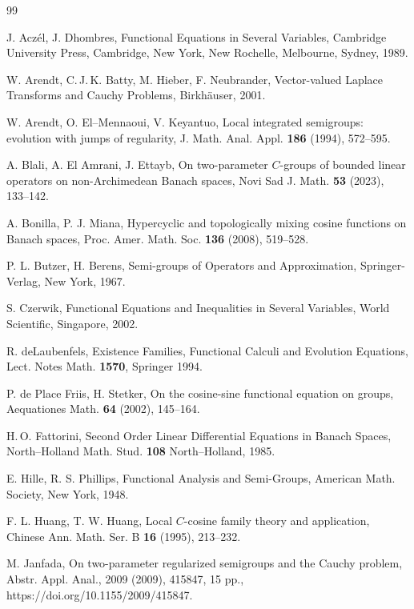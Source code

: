 \documentclass{amsart}
\theoremstyle{definition}
\theoremstyle{remark}
\numberwithin{equation}{section}
\begin{document}
\begin{thebibliography}{99}

J. Acz\'el, J. Dhombres, 
Functional Equations in Several Variables, 
Cambridge University Press, Cambridge, New York, New Rochelle, Melbourne, Sydney, 1989.

W. Arendt, C.\,J.\,K. Batty, M. Hieber, F. Neubrander,
Vector-valued Laplace Transforms and Cauchy Problems,
Birkh\"auser, 2001.

W. Arendt, O. El--Mennaoui, V. Keyantuo, 
Local integrated semigroups: evolution with jumps of regularity,
J. Math. Anal. Appl. {\bf 186} (1994), 572--595.

A. Blali, A. El Amrani, J. Ettayb,
On two-parameter $C$-groups of bounded linear operators
on non-Archimedean Banach spaces,
Novi Sad J. Math. {\bf 53} (2023), 133--142.

A. Bonilla, P. J. Miana, 
Hypercyclic and topologically mixing cosine functions on Banach
spaces, 
Proc. Amer. Math. Soc. {\bf 136} (2008), 519--528.

P. L. Butzer, H. Berens, 
Semi-groups of Operators and Approximation, 
Springer-Verlag,
New York, 1967.

S. Czerwik,
Functional Equations and
Inequalities in Several Variables,
World Scientific, Singapore, 2002.

R. deLaubenfels, 
Existence Families, Functional Calculi and Evolution Equations, 
Lect. Notes Math. {\bf 1570}, Springer 1994.

P. de Place Friis, H. Stetker,
On the cosine-sine functional equation on groups,
Aequationes Math. {\bf 64} (2002), 145--164.

H.\,O. Fattorini,
Second Order Linear Differential Equations in Banach Spaces,
North--Holland Math. Stud. \textbf{108} North--Holland, 1985.

E. Hille, R. S. Phillips,
Functional Analysis and Semi-Groups,
American Math. Society, New York, 1948.

F. L. Huang,
T. W. Huang,
 Local $C$-cosine family theory and application, 
Chinese
Ann. Math. Ser. B {\bf 16} (1995), 213--232.

M. Janfada, 
On two-parameter regularized semigroups and the Cauchy problem, 
Abstr. Appl. Anal., 2009 (2009), 415847, 15 pp., https://doi.org/10.1155/2009/415847.


\end{thebibliography}
\end{document}
